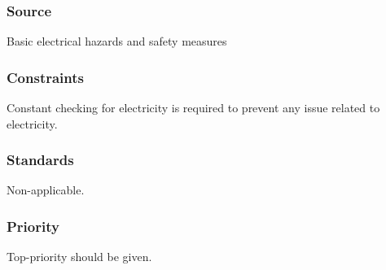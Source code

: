 \subsubsection{Source}
Basic electrical hazards and safety measures
\subsubsection{Constraints}
Constant checking for electricity is required to prevent any issue related to electricity. 
\subsubsection{Standards}
Non-applicable.
\subsubsection{Priority}
Top-priority should be given.
